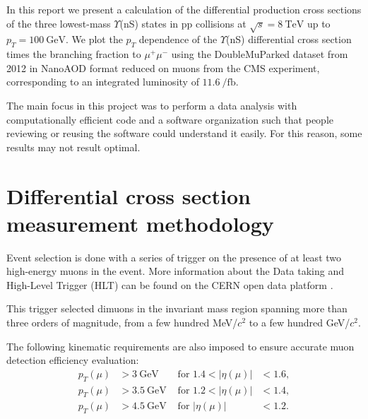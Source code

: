 \documentclass[a4paper,11pt]{article}
\begin{document}
In this report we present a calculation of the differential production cross sections of the three lowest-mass $\Upsilon$(nS) states in pp collisions at $\sqrt{s}=\SI{8}{\tera\eV}$ up to $p_T = \SI{100}{\giga\eV}$. 
We plot the $p_T$ dependence of the $\Upsilon$(nS) differential cross section times the branching fraction to $\mu^+\mu^-$ using the DoubleMuParked dataset from 2012 in NanoAOD format reduced on muons\cite{dataA} from the CMS experiment, corresponding to an integrated luminosity of $\SI{11.6}{\per\femto\barn}$. 

The main focus in this project was to perform a data analysis with computationally efficient code and a software organization such that people reviewing or reusing the software could understand it easily. For this reason, some results may not result optimal.

\section{Differential cross section measurement methodology}
Event selection is done with a series of trigger on the presence of at least two high-energy muons in the event. More information about the Data taking and High-Level Trigger (HLT) can be found on the CERN open data platform \cite{dataB}\cite{dataC}.

This trigger selected dimuons in the invariant mass region spanning more than three orders of magnitude, from a few hundred MeV/$c^2$ to a few hundred GeV/$c^2$.

 The following kinematic requirements are also imposed to ensure accurate muon detection efficiency evaluation:
\begin{align}
p_T(\mu) &> \SI{3}{\giga\eV} &   \text{ for } 1.4 < |\eta(\mu)|&< 1.6,\\\nonumber
p_T(\mu) &> \SI{3.5}{\giga\eV} &  \text{ for } 1.2< |\eta(\mu)|&<1.4,\\\nonumber
p_T(\mu) &> \SI{4.5}{\giga\eV} & \text{ for } |\eta(\mu)|&< 1.2.
\end{align}
\end{document}
